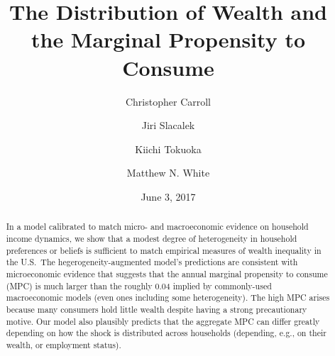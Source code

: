 \documentclass[12pt,titlepage]{econtex}
\begin{document}
\title{The Distribution of Wealth and \\ the Marginal Propensity to Consume \\  }

\author{
{\small Christopher Carroll\authNum} %
\and
{\small Jiri Slacalek\authNum} %
\and
{\small Kiichi Tokuoka\authNum} %
\and
{\small  Matthew N. White\authNum} %
}



\date{June 3, 2017}

\maketitle

\begin{abstract}
  In a model calibrated to match micro- and macroeconomic evidence on household income dynamics, we show that a modest degree of heterogeneity in household preferences or beliefs is sufficient to match empirical measures of wealth inequality in the U.S.\ The hegerogeneity-augmented model's predictions are consistent with microeconomic evidence that suggests that the annual marginal propensity to consume (MPC) is much larger than the roughly 0.04 implied by commonly-used macroeconomic models (even ones including some heterogeneity).  The high MPC arises because many consumers hold little wealth despite having a strong precautionary motive.  Our model also plausibly predicts that the aggregate MPC can differ greatly depending on how the shock is distributed across households (depending, e.g., on their wealth, or employment status).
\end{abstract}
\end{document}
